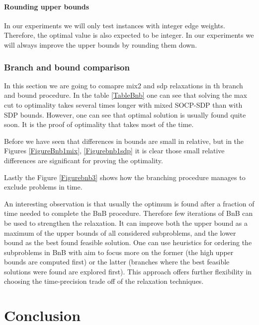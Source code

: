 \documentclass[12pt]{book}
\theoremstyle{definition}
\begin{document}
\subsubsection{Rounding upper bounds}
In our experiments we will only test instances with integer edge weights. Therefore, the optimal value is also expected to be integer. In our experiments we will always improve the upper bounds by rounding them down.
  


\subsection{Branch and bound comparison}
In this section we are going to comapre mix2 and sdp relaxations in th branch and bound procedure. In the table \ref{TableBnb} one can see that solving the max cut to optimality takes several times longer with mixed SOCP-SDP than with SDP bounds.
However, one can see that optimal solution is usually found quite soon. It is the proof of optimality that takes most of the time.

Before we have seen that differences in bounds are small in relative, but in the Figures \ref{FigureBnb1mix}, \ref{Figurebnb1sdp} it is clear those small relative differences are significant for proving the optimality.

Lastly the Figure \ref{Figurebnb3} shows how the branching procedure manages to exclude problems in time.

An interesting observation is that usually the optimum is found after a fraction of time needed to complete the BnB procedure. Therefore few iterations of BnB can be used to strengthen the relaxation. It can improve both the upper bound as a maximum of the upper bounds of all considered subproblems, and the lower bound as the best found feasible solution. One can use heuristics for ordering the subproblems in BnB with aim to focus more on the former (the high upper bounds are computed first) or the latter (branches where the best feasible solutions were found are explored first). This approach offers further flexibility in choosing the time-precision trade off of the relaxation techniques.




\chapter*{Conclusion}
\end{document}
